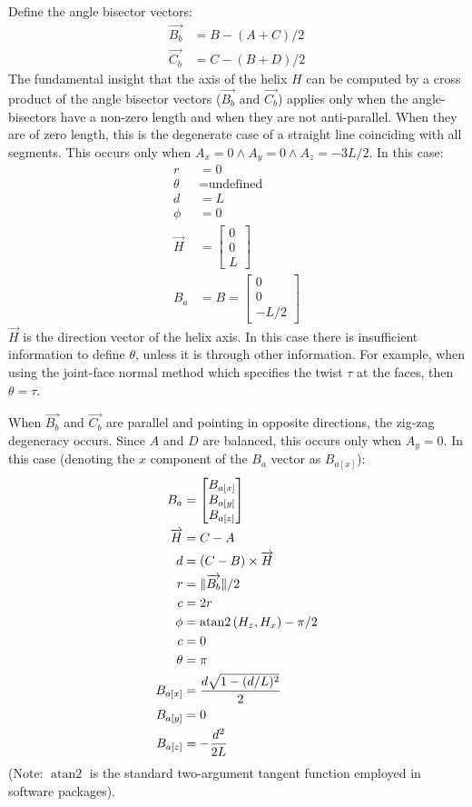 \documentclass{svproc}
\DeclarePairedDelimiter{\norm}{\lVert}{\rVert}
\DeclareMathOperator{\atantwo}{atan2}
\begin{document}
Define the angle bisector vectors:
\begin{align}
  \overrightarrow{B_b} &= B - (A + C)/2 \\
  \overrightarrow{C_b} &= C - (B + D)/2
  \end{align}
The fundamental insight that the axis of the helix $H$ can be
computed by a cross product of the angle bisector
vectors ($\overrightarrow{B_b}$ and $\overrightarrow{C_b}$) applies only
when the angle-bisectors have a non-zero length and when
they are not anti-parallel. When they are of zero length, this is
the degenerate case of a straight line coinciding with all segments.
This occurs only when $A_x = 0 \wedge A_y = 0 \wedge A_z = -3L/2$.
In this case:
\begin{align}
  r &= 0 \\
  \theta &= \text{undefined}\\
  d &= L \\
  \phi &= 0 \\
  \overrightarrow{H} &=  \begin{bmatrix} 0 \\ 0 \\ L  \end{bmatrix} \\
  B_a &= B = \begin{bmatrix} 0 \\ 0 \\ -L/2  \end{bmatrix}
\end{align}
$\overrightarrow{H}$ is the direction vector of the helix axis.
In this case there is insufficient information to define $\theta$,
unless it is through other information. For example, when using
the joint-face normal method which specifies
the twist $\tau$ at the faces, then $\theta = \tau$.

When $\overrightarrow{B_b}$ and $\overrightarrow{C_b}$ are parallel and pointing in opposite directions,
the zig-zag degeneracy occurs. Since
$A$ and $D$ are balanced, this occurs only when $A_y = 0$.
In this case (denoting the $x$ component of the $B_a$ vector as $B_{a[x]}$):
\begin{align}
  B_{a} &= \begin{bmatrix} B_{a[x]} \\ B_{a[y]} \\ B_{a[z]}  \end{bmatrix} \\
  \overrightarrow{H} &=  C - A \\
  d &= (C - B) \times \overrightarrow{H} \\
  r &= \norm{\overrightarrow{B_b}} / 2 \\
  c &= 2 r\\
  \phi &= \atantwo{(H_z,H_x)} - \pi/2 \\
  c &= 0 \\
  \theta &= \pi \\
  B_{a[x]} &= \frac{d\sqrt{1 - (d/L)^2}}{2} \\
  B_{a[y]} &= 0 \\
  B_{a[z]} &= -\frac{d^2}{2L}
\end{align}
(Note: $\atantwo$ is the standard two-argument tangent function employed in software packages).
\end{document}
